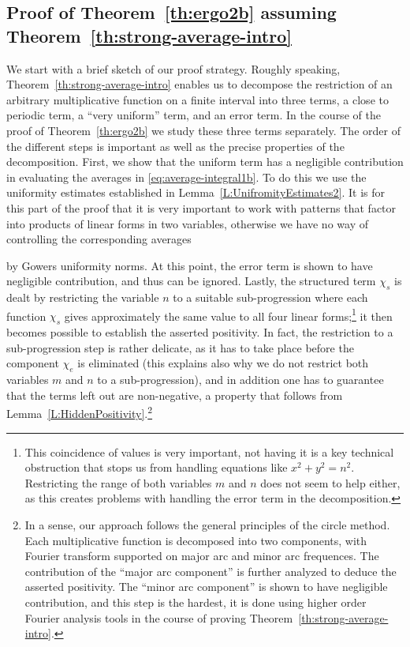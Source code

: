 \documentclass[11pt]{amsart}
\theoremstyle{definition}
\begin{document}
\subsection{Proof of Theorem~\ref{th:ergo2b}
assuming Theorem~\ref{th:strong-average-intro}}\label{SS:assuming}
  We start with a brief sketch of our
 proof strategy. Roughly speaking, Theorem~\ref{th:strong-average-intro}
enables us to decompose  the restriction of an arbitrary
multiplicative function on a finite interval  into three terms, a
close to  periodic term, a ``very uniform'' term, and an error term.
In the course of the proof of Theorem~\ref{th:ergo2b} we study these
three terms separately. The order of the different steps is
important as well as the precise properties of the decomposition.
 First, we show that the uniform term has a negligible contribution
in evaluating the averages in \eqref{eq:average-integral1b}. To do
this we use  the  uniformity estimates established in
Lemma~\ref{L:UnifromityEstimates2}. It is for this part of the proof
that it is very important to work with patterns that factor into
products of linear forms in two variables, otherwise we have no
 way of controlling the corresponding averages
 
 by Gowers uniformity norms. At this
point, the error term is shown to have negligible contribution, and
thus can be ignored.
   Lastly, the
structured term $\chi_s$  is dealt by restricting the variable $n$
to a suitable sub-progression where each function $\chi_s$ gives
approximately the same value to all four linear
forms;\footnote{\label{foot3}This  coincidence of values is very
important, not having it is a key technical obstruction that stops
us from handling equations like $x^2+y^2=n^2$. Restricting the range
of both variables $m$ and $n$ does not seem to help either, as this
creates problems with  handling the error term in the
decomposition.}
 it  then becomes possible to  establish the asserted positivity.
 In fact, the restriction to a
sub-progression step is  rather delicate, as it has to take place
before the component $\chi_e$ is eliminated (this explains also why
we do not restrict both variables $m$ and $n$ to a sub-progression), and in addition one
has to guarantee that the terms left out are non-negative, a
property that follows from
Lemma~\ref{L:HiddenPositivity}.\footnote{In a sense, our approach
follows the general principles of the circle method. Each
multiplicative function  is decomposed into two components, with
Fourier transform supported on major arc and minor arc frequences.
The contribution of the ``major arc component'' is further analyzed
to deduce the asserted positivity. The ``minor arc component'' is
shown to have negligible contribution, and this step is the hardest,
it is done using higher order Fourier analysis tools in the course
of proving Theorem~\ref{th:strong-average-intro}.}
\end{document}
